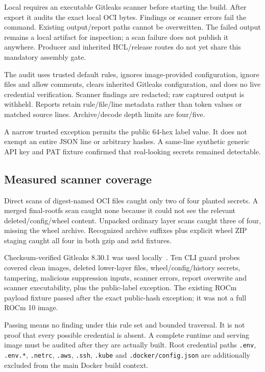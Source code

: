 \documentclass[11pt,a4paper]{article}
\newcommand{\file}[1]{\nolinkurl{#1}}
\newcommand{\term}[1]{\texttt{\detokenize{#1}}}
\begin{document}
Local \term{assemble --execute} requires an executable Gitleaks scanner before
starting the build. After export it audits the exact local OCI bytes. Findings
or scanner errors fail the command. Existing output/report paths cannot be
overwritten. The failed output remains a local artifact for inspection; a scan
failure does not publish it anywhere. Producer and inherited HCL/release routes
do not yet share this mandatory assembly gate.

The audit uses trusted default rules, ignores image-provided configuration,
ignore files and allow comments, clears inherited Gitleaks configuration, and
does no live credential verification. Scanner findings are redacted; raw
captured output is withheld. Reports retain rule/file/line metadata rather than token values
or matched source lines. Archive/decode depth limits are four/five.

A narrow trusted exception permits the public 64-hex
\term{vllm.rocm.dependency_key} label value. It does not exempt an entire JSON
line or arbitrary hashes. A same-line synthetic generic API key and PAT fixture
confirmed that real-looking secrets remained detectable.

\subsection{Measured scanner coverage}

Direct scans of digest-named OCI files caught only two of four planted secrets.
A merged final-rootfs scan caught none because it could not see the relevant
deleted/config/wheel content. Unpacked ordinary layer scans caught three of four,
missing the wheel archive. Recognized archive suffixes plus explicit wheel ZIP
staging caught all four in both gzip and zstd fixtures.

Checksum-verified Gitleaks 8.30.1 was used locally~\cite{gitleaks}. Ten CLI guard
probes covered clean images, deleted lower-layer files, wheel/config/history
secrets, tampering, malicious suppression inputs, scanner errors, report overwrite
and scanner executability, plus the public-label exception. The existing ROCm
payload fixture passed after the exact public-hash exception; it was not a full
ROCm 10 image.

Passing means no finding under this rule set and bounded traversal. It is not
proof that every possible credential is absent. A complete runtime and serving
image must be audited after they are actually built. Root credential paths
\file{.env}, \file{.env.*}, \file{.netrc}, \file{.aws}, \file{.ssh},
\file{.kube} and \file{.docker/config.json} are additionally excluded from the
main Docker build context.
\end{document}
